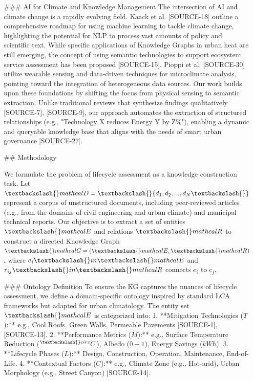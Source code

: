 \documentclass{article}
\begin{document}
\#\#\# AI for Climate and Knowledge Management
The intersection of AI and climate change is a rapidly evolving field. Kaack et al. [SOURCE-18] outline a comprehensive roadmap for using machine learning to tackle climate change, highlighting the potential for NLP to process vast amounts of policy and scientific text. While specific applications of Knowledge Graphs in urban heat are still emerging, the concept of using semantic technologies to support ecosystem service assessment has been proposed [SOURCE-15]. Pioppi et al. [SOURCE-30] utilize wearable sensing and data-driven techniques for microclimate analysis, pointing toward the integration of heterogeneous data sources. Our work builds upon these foundations by shifting the focus from physical sensing to semantic extraction. Unlike traditional reviews that synthesize findings qualitatively [SOURCE-7], [SOURCE-9], our approach automates the extraction of structured relationships (e.g., "Technology X reduces Energy Y by Z\%"), enabling a dynamic and queryable knowledge base that aligns with the needs of smart urban governance [SOURCE-27].

\#\# Methodology

We formulate the problem of lifecycle assessment as a knowledge construction task. Let $\textbackslash{}mathcal{D} = \textbackslash{}{d_1, d_2, ..., d_N\textbackslash{}}$ represent a corpus of unstructured documents, including peer-reviewed articles (e.g., from the domains of civil engineering and urban climate) and municipal technical reports. Our objective is to extract a set of entities $\textbackslash{}mathcal{E}$ and relations $\textbackslash{}mathcal{R}$ to construct a directed Knowledge Graph $\textbackslash{}mathcal{G} = (\textbackslash{}mathcal{E}, \textbackslash{}mathcal{R})$, where $e_i \textbackslash{}in \textbackslash{}mathcal{E}$ and $r_{ij} \textbackslash{}in \textbackslash{}mathcal{R}$ connects $e_i$ to $e_j$.

\#\#\# Ontology Definition
To ensure the KG captures the nuances of lifecycle assessment, we define a domain-specific ontology inspired by standard LCA frameworks but adapted for urban climatology. The entity set $\textbackslash{}mathcal{E}$ is categorized into:
1.  **Mitigation Technologies ($T$):** e.g., Cool Roofs, Green Walls, Permeable Pavements [SOURCE-1], [SOURCE-13].
2.  **Performance Metrics ($M$):** e.g., Surface Temperature Reduction ($^{\textbackslash{}circ}C$), Albedo ($0-1$), Energy Savings ($kWh$).
3.  **Lifecycle Phases ($L$):** {Design, Construction, Operation, Maintenance, End-of-Life}.
4.  **Contextual Factors ($C$):** e.g., Climate Zone (e.g., Hot-arid), Urban Morphology (e.g., Street Canyon) [SOURCE-14].
\end{document}
